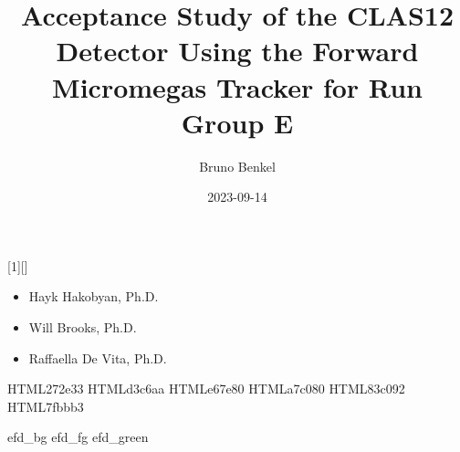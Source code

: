 
\title{Acceptance Study of the CLAS12 Detector Using the Forward Micromegas Tracker for Run Group E}
\author{Bruno Benkel}
\date{2023-09-14}

[1][]
{
    \vspace{21pt}

    \begin{center}
        \textbf{\inserttitle}\par
        \insertauthor\par
    \end{center}

    \vspace{48pt}

    \begin{itemize}
        \item[]
            Hayk Hakobyan, Ph.D.

        \item[]
            Will Brooks, Ph.D.

        \item[]
            Raffaella De Vita, Ph.D.
    \end{itemize}

    \begin{flushright}
        \insertdate\par
    \end{flushright}

    \vfill
}


\definecolor{efd_bg}    {HTML}{272e33}
\definecolor{efd_fg}    {HTML}{d3c6aa}
\definecolor{efd_red}   {HTML}{e67e80}
\definecolor{efd_green} {HTML}{a7c080}
\definecolor{efd_aqua}  {HTML}{83c092}
\definecolor{efd_blue}  {HTML}{7fbbb3}

 {efd_bg}      %
 {efd_fg}      %
 {efd_green}   %

